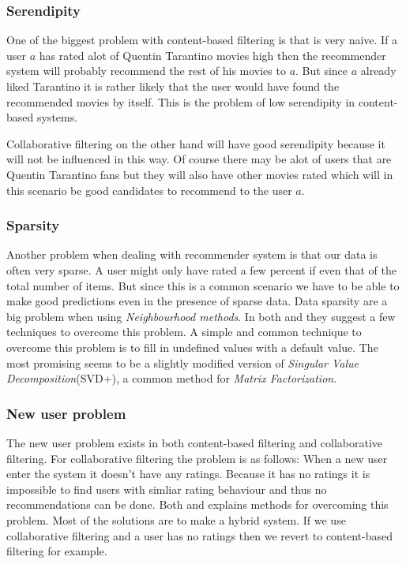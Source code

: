 \documentclass[a4paper,11pt]{article}
\begin{document}
\subsubsection{Serendipity}
One of the biggest problem with content-based filtering is that is very naive. If a user $a$ has rated alot of Quentin Tarantino movies high then the recommender system will probably recommend the rest of his movies to $a$. But since $a$ already liked Tarantino it is rather likely that the user would have found the recommended movies by itself. This is the problem of low serendipity in content-based systems.

Collaborative filtering on the other hand will have good serendipity because it will not be influenced in this way. Of course there may be alot of users that are Quentin Tarantino fans but they will also have other movies rated which will in this scenario be good candidates to recommend to the user $a$.

\subsubsection{Sparsity}
Another problem when dealing with recommender system is that our data is often
very sparse. A user might only have rated a few percent if even that of the total
number of items. But since this is a common scenario we have to be able to make
good predictions even in the presence of sparse data. Data sparsity are a big problem when using \emph{Neighbourhood methods}\cite{springerlink:10.1007/978-0-387-85820-3_1}. In both \cite{1423975} and \cite{springerlink:10.1007/978-0-387-85820-3_1} they suggest a few techniques to overcome this problem. A simple and common technique to overcome this problem is to fill in undefined values with a default value. The most promising seems to be a slightly modified version of \emph{Singular Value Decomposition}(SVD+), a common method for \emph{Matrix Factorization}.

\subsubsection{New user problem}
The new user problem exists in both content-based filtering and collaborative filtering. For collaborative filtering the problem is as follows: When a new user enter the system it doesn't have any ratings. Because it has no ratings it is impossible to find users with simliar rating behaviour and thus no recommendations can be done\cite{1423975}. Both \cite{1423975} and \cite{springerlink:10.1007/978-0-387-85820-3_1} explains methods for overcoming this problem. Most of the solutions are to make a hybrid system. If we use collaborative filtering and a user has no ratings then we revert to content-based filtering for example.
\end{document}
